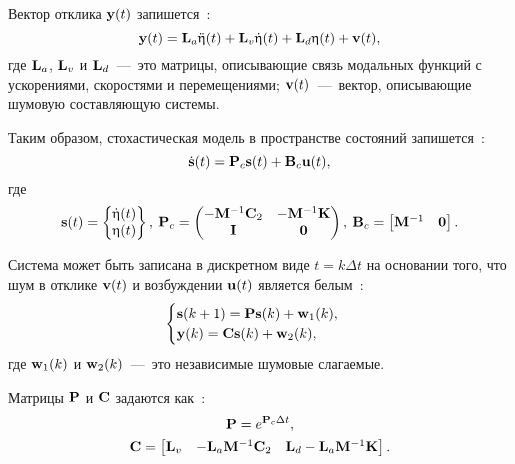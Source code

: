 Вектор отклика $ \mathbf{y}(t) $ запишется~\cite{lib:oma:Nilsson}:
\begin{equation}
	\mathbf{y}(t) = \mathbf{L}_a \ddot{\mathbf{\upeta}}(t) + \mathbf{L}_v \dot{\mathbf{\upeta}}(t) + \mathbf{L}_d \upeta(t) + \mathbf{v}(t),
\end{equation}
где $ \mathbf{L}_a $, $ \mathbf{L}_v $ и $ \mathbf{L}_d $~---~это матрицы, описывающие связь модальных функций с ускорениями, скоростями и перемещениями; $ \mathbf{v}(t) $~---~вектор, описывающие шумовую составляющую системы. 

Таким образом, стохастическая модель в пространстве состояний запишется~\cite{lib:oma:Juang}:
\begin{equation}
	\dot{\mathbf{s}}(t) = \mathbf{P}_c \mathbf{s}(t) + \mathbf{B}_c \mathbf{u}(t), \label{eq:stochasticModelSSI}
\end{equation}
где 
\begin{equation}
	\begin{gathered}
		\mathbf{s}(t) = 
		\begin{Bmatrix} 
			\dot{\mathbf{\upeta}}(t) \\ 
			\mathbf{\upeta}(t) 
		\end{Bmatrix}, \:
		\mathbf{P}_c =
		\begin{pmatrix}
			-\mathbf{M} ^ {-1} \mathbf{C}_2 & -\mathbf{M} ^ {-1} \mathbf{K} \\
			 \mathbf{I} & \mathbf{0}
		\end{pmatrix}, \:
		\mathbf{B}_c = 
		\begin{bmatrix}
			\mathbf{M} ^ {-1} &
			\mathbf{0}	
		\end{bmatrix}.
	\end{gathered}
\end{equation}

Система может быть записана в дискретном виде $ t = k \Delta t $ на основании того, что шум в отклике $ \mathbf{v}(t) $ и возбуждении $ \mathbf{u}(t) $ является белым~\cite{lib:oma:Nilsson}:
\begin{equation}
	\begin{cases}
		\mathbf{s}(k + 1) = \mathbf{P} \mathbf{s}(k) + \mathbf{w}_1(k), \\
		\mathbf{y}(k) = \mathbf{C} \mathbf{s}(k) + \mathbf{w}_2(k),
	\end{cases}
\end{equation}
где $ \mathbf{w}_1(k) $ и $ \mathbf{w}_2(k) $~---~это независимые шумовые слагаемые. 

Матрицы $ \mathbf{P} $ и $ \mathbf{C} $ задаются как~\cite{lib:oma:Nilsson}:
\begin{gather}
	\mathbf{P} = e ^ {\mathbf{P}_c \Delta t}, \\
	\mathbf{C} = 
	\begin{bmatrix} 
		\mathbf{L}_v & -\mathbf{L}_a \mathbf{M} ^ {-1} \mathbf{C}_2 & \mathbf{L}_d - \mathbf{L}_a \mathbf{M} ^ {-1} \mathbf{K}
	\end{bmatrix}.
\end{gather}

